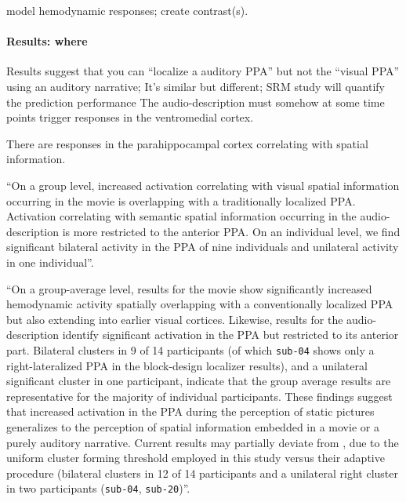 %
model hemodynamic responses;
%
create contrast(s).




\paragraph{Results: where}

%
Results suggest that you can ``localize a auditory PPA'' but not the ``visual
PPA'' using an auditory narrative; It's similar but different; SRM study will
quantify the prediction performance
%
The audio-description must somehow at some time points trigger responses in the
ventromedial cortex.

%
There are responses in the parahippocampal cortex correlating with
spatial information.

``On a group level, increased activation correlating with visual spatial information
occurring in the movie is overlapping with a traditionally localized PPA.
Activation correlating with semantic spatial information occurring in the
audio-description is more restricted to the anterior PPA.
On an individual level, we find significant bilateral activity in the PPA
of nine individuals and unilateral activity in one individual''.

``On a group-average level, results for the movie show significantly
increased hemodynamic activity spatially overlapping with a conventionally
localized PPA but also extending into earlier visual cortices.
Likewise, results for the audio-description identify significant activation in
the PPA but restricted to its anterior part.
Bilateral clusters in 9 of 14
participants (of which \texttt{sub-04} shows only a right-lateralized PPA
in the block-design localizer results), and a unilateral
significant cluster in one participant, indicate that the group average results
are representative for the majority of individual participants.
These findings suggest that increased activation in the PPA during the
perception of static pictures generalizes to the perception of spatial
information embedded in a movie or a purely auditory narrative.
%
Current results may partially deviate from \citet{sengupta2016extension}, due to
the uniform cluster forming threshold employed in this study versus their
adaptive procedure (bilateral clusters in 12 of 14 participants and a unilateral
right cluster in two participants (\texttt{sub-04}, \texttt{sub-20})''.


